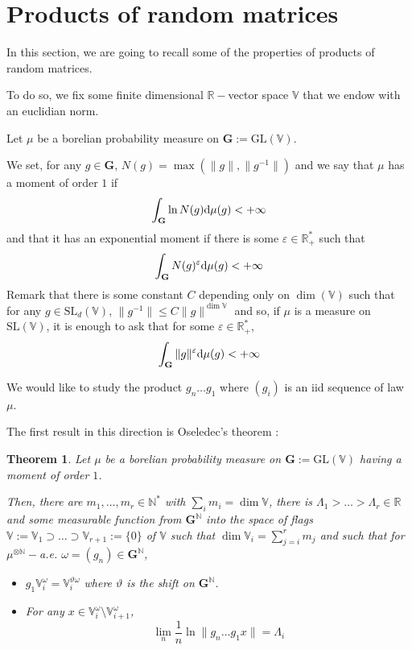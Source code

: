 \documentclass[11pt]{amsart}
\newtheorem{theorem}{Theorem}[section]
\theoremstyle{definition}
\theoremstyle{remark}
\numberwithin{equation}{section}
\begin{document}
\appendix
\section{Products of random matrices} \label{annexe_produits_matrices}

In this section, we are going to recall some of the properties of products of random matrices.

To do so, we fix some finite dimensional ${\mathbb R}-$vector space ${\mathbb V}$ that we endow with an euclidian norm.

Let $\mu$ be a borelian probability measure on ${\mathbf G}:=\mathrm{GL}({\mathbb V})$.

We set, for any $g\in {\mathbf G}$, $N(g) = \max(\|g\|,\|g^{-1}\|)$ and we say that $\mu$ has a moment of order $1$ if
\[
\int_{\mathbf G} \ln N(g) {{\rm d}}\mu(g)<+\infty
\]
and that it has an exponential moment if there is some $\varepsilon \in {\mathbb R}_+^\ast$ such that
\[
\int_{\mathbf G} N(g)^\varepsilon {{\rm d}}\mu(g) <+\infty
\]
Remark that there is some constant $C$ depending only on $\dim({\mathbb V})$ such that for any $g\in \mathrm{SL}_d({\mathbb V})$, $\|g^{-1} \| \leqslant C \|g\|^{\dim{\mathbb V}}$ and so, if $\mu$ is a measure on $\mathrm{SL}({\mathbb V})$, it is enough to ask that for some $\varepsilon\in {\mathbb R}_+^\ast$,
\[
\int_{\mathbf G} \|g\|^\varepsilon {{\rm d}}\mu(g)<+\infty
\]

We would like to study the product $g_n \dots g_1$ where $(g_i)$ is an iid sequence of law $\mu$.

The first result in this direction is Oseledec's theorem :
\begin{theorem}
Let $\mu$ be a borelian probability measure on ${\mathbf G}:=\mathrm{GL}({\mathbb V})$ having a moment of order $1$.

Then, there are $m_1 , \dots , m_r \in {\mathbb N}^\ast $ with $\sum_i m_i=\dim{\mathbb V}$, there is $\Lambda_1>\dots>\Lambda_r \in {\mathbb R}$ and some measurable function from ${\mathbf G}^{\mathbb N}$ into the space of flags ${\mathbb V}:={\mathbb V}_1 \supset \dots \supset  {\mathbb V}_{r+1}:=\{0\}$ of ${\mathbb V}$ such that $\dim {\mathbb V}_i =  \sum_{j=i}^{r} m_j$ and such that for $\mu^{\otimes {\mathbb N}}-$a.e. $\omega =(g_n) \in {\mathbf G}^{\mathbb N}$,
\begin{itemize}
\item $g_1 {\mathbb V}_i^\omega = {\mathbb V}_i^{\vartheta \omega}$ where $\vartheta$ is the shift on ${\mathbf G}^{\mathbb N}$.
\item For any $x\in{\mathbb V}_i^\omega \setminus {\mathbb V}_{i+1}^\omega$,
\[
\lim_n \frac 1 n \ln\|g_n \dots g_1 x\|=\Lambda_i
\]
\end{itemize}
\end{theorem}
\end{document}
